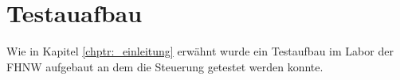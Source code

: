 \section{Testauafbau}
Wie in Kapitel \ref{chptr:_einleitung} erwähnt wurde ein Testaufbau im Labor der FHNW aufgebaut an dem die Steuerung getestet werden konnte.